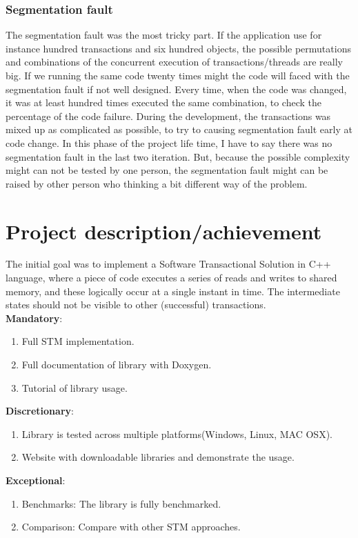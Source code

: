 \documentclass[12pt]{article}
\begin{document}
\subsubsection{Segmentation fault}
The segmentation fault was the most tricky part. If the application use for instance hundred transactions and six hundred objects, the possible permutations and combinations of the concurrent execution of transactions/threads are really big. If we running the same code twenty times might the code will faced with the segmentation fault if not well designed. Every time, when the code was changed, it was at least hundred times executed the same combination, to check the percentage of the code failure. During the development, the transactions was mixed up as complicated as possible, to try to causing segmentation fault early at code change. In this phase of the project life time, I have to say there was no segmentation fault in the last two iteration. But, because the possible complexity might can not be tested by one person, the segmentation fault might can be raised by other person who thinking a bit different way of the problem.\\   
   
\newpage
\section{Project description/achievement}
The initial goal was to implement a Software Transactional Solution in C++ language, where a piece of code executes a series of reads and writes to shared memory, and these logically occur at a single instant in time. The intermediate states should not be visible to other (successful) transactions.\\
\textbf{Mandatory}:
\begin{enumerate}
\item Full STM implementation. 
\item Full documentation of library with Doxygen.
\item Tutorial of library usage.
\end{enumerate}
\textbf{Discretionary}:
\begin{enumerate}
\item Library is tested across multiple platforms(Windows, Linux, MAC OSX). 
\item Website with downloadable libraries and demonstrate the usage.
\end{enumerate}
\textbf{Exceptional}:
\begin{enumerate}
\item Benchmarks: The library is fully benchmarked. 
\item Comparison: Compare with other STM approaches.
\end{enumerate}
\end{document}
